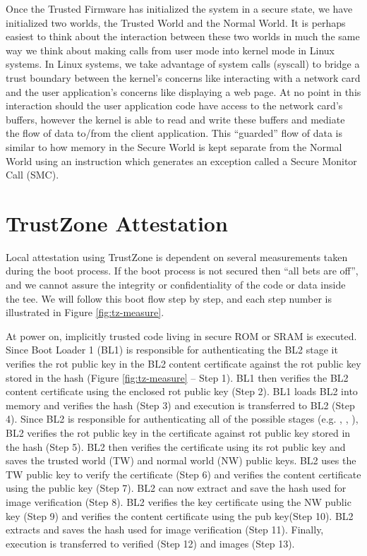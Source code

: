 Once the Trusted Firmware has initialized the system in a secure state, we have initialized two worlds, the Trusted World and the Normal World. It is perhaps easiest to think about the interaction between these two worlds in much the same way we think about making calls from user mode into kernel mode in Linux systems. In Linux systems, we take advantage of system calls (syscall) to bridge a trust boundary between the kernel's concerns like interacting with a network card and the user application's concerns like displaying a web page. At no point in this interaction should the user application code have access to the network card's buffers, however the kernel is able to read and write these buffers and mediate the flow of data to/from the client application. This ``guarded'' flow of data is similar to how memory in the Secure World is kept separate from the Normal World using an instruction which generates an exception called a Secure Monitor Call (SMC).

\section{TrustZone Attestation}

Local \gls{attestation} using TrustZone is dependent on several \glspl{measurement} taken during the boot process. If the boot process is not secured then ``all bets are off'', and we cannot assure the integrity or confidentiality of the code or data inside the \gls{tee}. We will follow this boot flow step by step, and each step number is illustrated in Figure \ref{fig:tz-measure}.

At power on, implicitly trusted code living in secure ROM or SRAM is executed. Since Boot Loader 1 (BL1) is responsible for authenticating the BL2 stage it verifies the \gls{rot} public key in the BL2 content certificate against the \gls{rot} public key stored in the hash (Figure \ref{fig:tz-measure} -- Step 1). BL1 then verifies the BL2 content certificate using the enclosed \gls{rot} public key (Step 2). BL1 loads BL2 into memory and verifies the hash (Step 3) and execution is transferred to BL2 (Step 4). Since BL2 is responsible for authenticating all of the possible \bltx stages (e.g. \blto, \blttw, \bltt), BL2 verifies the \gls{rot} public key in the certificate against \gls{rot} public key stored in the hash (Step 5). BL2 then verifies the certificate using its \gls{rot} public key and saves the trusted world (TW) and normal world (NW) public keys. BL2 uses the TW public key to verify the \bltx certificate (Step 6) and verifies the \bltx content certificate using the \bltx public key (Step 7). BL2 can now extract and save the \bltx hash used for \bltx image verification (Step 8). BL2 verifies the \bltt key certificate using the NW public key (Step 9) and verifies the \bltt content certificate using the \bltt pub key(Step 10). BL2 extracts and saves the \bltt hash used for \bltt image verification (Step 11). Finally, execution is transferred to verified \bltx (Step 12) and \bltt images (Step 13).

